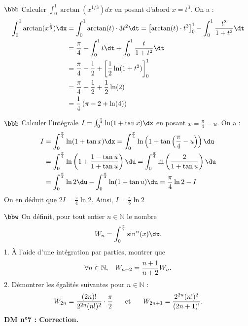 \documentclass[11pt]{article}
\begin{document}
\begin{exercice}{$\bbb$}{}
    Calculer $\int_0^1{\arctan(x^{1/3})dx}$ en posant d'abord $x=t^3$.
    \tcblower
    On a :
    \begin{align*}
        \int_0^1{\arctan(x^{\frac{1}{3}})\dx}&=\int_0^1{\arctan(t)\cdot3t^2\dt}=\left[\arctan(t)\cdot t^3\right]_0^1 - \int_0^1{\frac{t^3}{1+t^2} \dt}\\
        &=\frac{\pi}{4} - \int_0^1{t\dt}+\int_0^1{\frac{t}{1+t^2}\dt}\\
        &=\frac{\pi}{4} - \frac{1}{2} + \left[\frac{1}{2}\ln(1+t^2)\right]_0^1\\
        &=\frac{\pi}{4} - \frac{1}{2} + \frac{1}{2}\ln(2)\\
        &=\frac{1}{4}\left(\pi - 2 + \ln(4)\right)
    \end{align*}
\end{exercice}

\begin{exercice}{$\bbb$}{}
    Calculer l'intégrale $I = \int_0^{\frac{\pi}{4}}{\ln(1+\tan x)\dx}$ en posant $x=\frac{\pi}{4}-u$.
    \tcblower
    On a :
    \begin{align*}
        I &= \int_0^{\frac{\pi}{4}}{\ln(1+\tan x)\dx} = \int_{0}^{\frac{\pi}{4}}{\ln\left(1+\tan\left(\frac{\pi}{4}-u\right)\right)\du}\\
        &=\int^{\frac{\pi}{4}}_0{\ln\left(1+\frac{1-\tan u}{1+\tan u}\right)\du}=\int_0^{\frac{\pi}{4}}{\ln\left(\frac{2}{1+\tan u}\right)\du}\\
        &=\int_0^{\frac{\pi}{4}}{\ln2\du}-\int_0^{\frac{\pi}{4}}{\ln(1+\tan u)\du} = \frac{\pi}{4}\ln2 - I
    \end{align*}
    On en déduit que $2I = \frac{\pi}{4}\ln2$. Ainsi, $I=\frac{\pi}{8}\ln2$
\end{exercice}

\begin{exercice}{$\bbw$}{}
    On définit, pour tout entier $n\in\mathbb{N}$ le nombre
    \begin{equation*}
        W_n = \int_0^{\frac{\pi}{2}}{\sin^n(x)\dx}.
    \end{equation*}
    1. À l'aide d'une intégration par parties, montrer que
    \begin{equation*}
        \forall{n\in\mathbb{N}}, \hspace{0.3cm} W_{n+2} = \frac{n+1}{n+2}W_n.
    \end{equation*}
    2. Démontrer les égalités suivantes pour $n\in\mathbb{N}$ :
    \begin{equation*}
        W_{2n}=\frac{(2n)!}{2^{2n}(n!)^2}\cdot\frac{\pi}{2} \hspace{0.5cm} \text{ et } \hspace{0.5cm} W_{2n+1}=\frac{2^{2n}(n!)^2}{(2n+1)!}.
    \end{equation*}
    \tcblower
    \bf{DM n°7 : Correction.}
\end{exercice}
\end{document}
